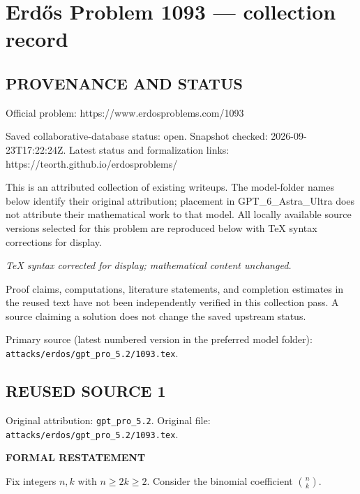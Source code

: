 \section*{Erd\H{o}s Problem 1093 --- collection record}

\subsection*{PROVENANCE AND STATUS}
Official problem: https://www.erdosproblems.com/1093

Saved collaborative-database status: open.
Snapshot checked: 2026-09-23T17:22:24Z.
Latest status and formalization links: https://teorth.github.io/erdosproblems/

This is an attributed collection of existing writeups. The model-folder names below identify their original attribution; placement in GPT\_6\_Astra\_Ultra does not attribute their mathematical work to that model. All locally available source versions selected for this problem are reproduced below with TeX syntax corrections for display.

\emph{TeX syntax corrected for display; mathematical content unchanged.}

Proof claims, computations, literature statements, and completion estimates in the reused text have not been independently verified in this collection pass. A source claiming a solution does not change the saved upstream status.

Primary source (latest numbered version in the preferred model folder): \texttt{attacks/erdos/gpt\_pro\_5.2/1093.tex}.

\subsection*{REUSED SOURCE 1}
Original attribution: \texttt{gpt\_pro\_5.2}.
Original file: \texttt{attacks/erdos/gpt\_pro\_5.2/1093.tex}.


\textbf{FORMAL RESTATEMENT}

Fix integers $n,k$ with $n\ge 2k\ge 2$.
Consider the binomial coefficient $\binom{n}{k}$.


